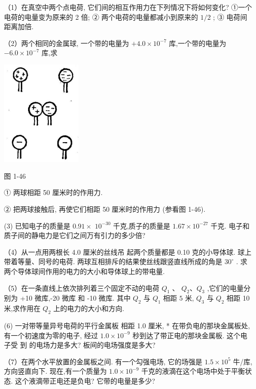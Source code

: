 \documentclass[10pt]{article}
\begin{document}
（1）在真空中两个点电荷, 它们间的相互作用力在下列情况下将如何变化? ①一个电荷的电量变为原来的 2 倍; ② 两个电荷的电量都减小到原来的 \(1/2\) ; ③ 电荷间距离加倍.

（2）两个相同的金属球, 一个带的电量为 \(+ {4.0} \times {10}^{-7}\) 库,一个带的电量为 \(- {6.0} \times {10}^{-7}\) 库,求

\begin{center}
\includegraphics[max width=0.3\textwidth]{images/01913056-1f15-74d8-9184-9aab52c9d66b_57_908319.jpg}
\end{center}

图 1-46

① 两球相距 50 厘米时的作用力.

② 把两球接触后, 再使它们相距 50 厘米时的作用力 (参看图 1-46).

(3) 已知电子的质量是 \({0.91} \times\) \({10}^{-{30}}\) 千克,质子的质量是 \({1.67} \times {10}^{-{27}}\) 千克. 电子和质子间的静电力是它们之间万有引力的多少倍?

（4）从一点用两根长 4.0 厘米的丝线吊 起两个质量都是 0.10 克的小导体球. 球上带着等量、同号的电荷. 两球互相排斥的结果使丝线跟竖直线所成的角是 \({30}^{ \circ }\) . 求两个导体球间作用的电力的大小和导体球上的带电量.

（5）在一条直线上依次排列着三个固定不动的电荷 \({Q}_{1}\) 、 \({Q}_{2}\text{、}{Q}_{3}\) ,它们的电量分别为 +10 微库,-20 微库 和 -10 微库. 其中 \({Q}_{2}\) 与 \({Q}_{1}\) 相距 \(5\) 米, \({Q}_{3}\) 与 \({Q}_{2}\) 相距 10 米,求作用在 \({Q}_{2}\) 上的电力的大小和方向.

(6) 一对带等量异号电荷的平行金属板 相距 1.0 厘米, * 在带负电的那块金属板处, 有一个初速度为零的电子, 经过 \({1.0} \times {10}^{-9}\) 秒到达了带正电的那块金属板. 这个电子受 到 的电场力是多大? 板间的电场强度是多大?

（7）在两个水平放置的金属板之间. 有一个勾强电场, 它的场强是 \({1.5} \times {10}^{5}\) 牛/库,方向竖直向下. 现在,有一个质量为 \({1.0} \times {10}^{-9}\) 千克的液滴在这个电场中处于平衡状态. 这个液滴带正电还是负电? 它带的电量是多少?
\end{document}
